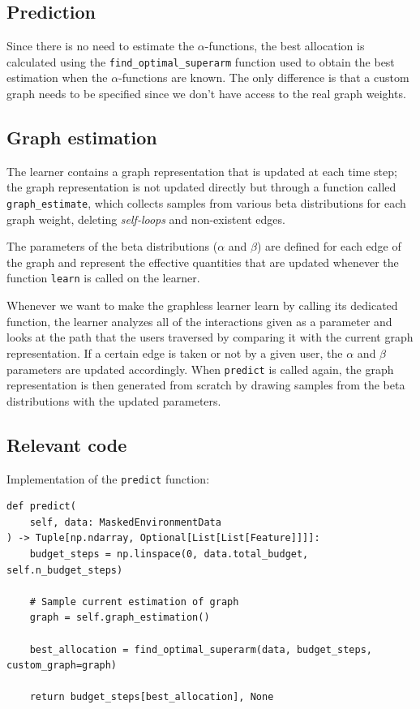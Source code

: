 \subsection{Prediction}

Since there is no need to estimate the $\alpha$-functions, the best allocation is calculated using the \texttt{find\_optimal\_superarm} function used to obtain the best estimation when the $\alpha$-functions are known.
The only difference is that a custom graph needs to be specified since we don't have access to the real graph weights.

\subsection{Graph estimation}

The learner contains a graph representation that is updated at each time step; the graph representation is not updated directly but through a function called \texttt{graph\_estimate}, which collects samples from various beta distributions for each graph weight, deleting \textit{self-loops} and non-existent edges.

The parameters of the beta distributions ($\alpha$ and $\beta$) are defined for each edge of the graph and represent the effective quantities that are updated whenever the function \texttt{learn} is called on the learner.

Whenever we want to make the graphless learner learn by calling its dedicated function, the learner analyzes all of the interactions given as a parameter and looks at the path that the users traversed by comparing it with the current graph representation.
If a certain edge is taken or not by a given user, the $\alpha$ and $\beta$ parameters are updated accordingly.
When \texttt{predict} is called again, the graph representation is then generated from scratch by drawing samples from the beta distributions with the updated parameters.

\subsection{Relevant code}

Implementation of the \texttt{predict} function:

\begin{lstlisting}[style=Python]
def predict(
	self, data: MaskedEnvironmentData
) -> Tuple[np.ndarray, Optional[List[List[Feature]]]]:
	budget_steps = np.linspace(0, data.total_budget, self.n_budget_steps)

	# Sample current estimation of graph
	graph = self.graph_estimation()

	best_allocation = find_optimal_superarm(data, budget_steps, custom_graph=graph)

	return budget_steps[best_allocation], None\end{lstlisting}

